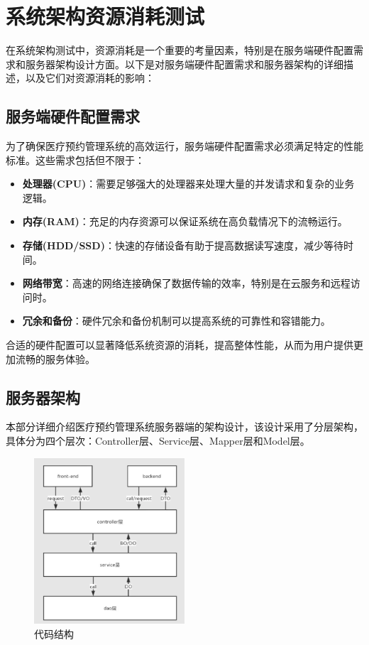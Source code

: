 \section{系统架构资源消耗测试}
在系统架构测试中，资源消耗是一个重要的考量因素，特别是在服务端硬件配置需求和服务器架构设计方面。以下是对服务端硬件配置需求和服务器架构的详细描述，以及它们对资源消耗的影响：

\subsection{服务端硬件配置需求}
为了确保医疗预约管理系统的高效运行，服务端硬件配置需求必须满足特定的性能标准。这些需求包括但不限于：

\begin{itemize}
	\item \textbf{处理器(CPU)}：需要足够强大的处理器来处理大量的并发请求和复杂的业务逻辑。
	\item \textbf{内存(RAM)}：充足的内存资源可以保证系统在高负载情况下的流畅运行。
	\item \textbf{存储(HDD/SSD)}：快速的存储设备有助于提高数据读写速度，减少等待时间。
	\item \textbf{网络带宽}：高速的网络连接确保了数据传输的效率，特别是在云服务和远程访问时。
	\item \textbf{冗余和备份}：硬件冗余和备份机制可以提高系统的可靠性和容错能力。
\end{itemize}

合适的硬件配置可以显著降低系统资源的消耗，提高整体性能，从而为用户提供更加流畅的服务体验。

\subsection{服务器架构}
本部分详细介绍医疗预约管理系统服务器端的架构设计，该设计采用了分层架构，具体分为四个层次：Controller层、Service层、Mapper层和Model层。

\begin{figure}[htbp]
	\centering
	\includegraphics[width=0.5\textwidth]{figures/31.png}
	\caption{代码结构}
\end{figure}

